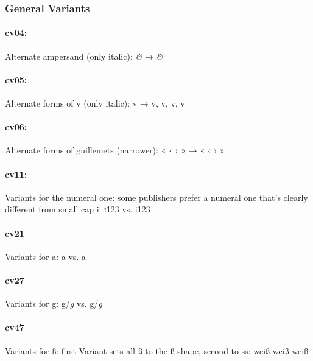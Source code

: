 \documentclass[pagesize,DIV14]{scrartcl}
\begin{document}
\subsubsection{General Variants}

\paragraph*{cv04:} Alternate ampersand (only italic): \textit{\&} → \textit{\&}

\paragraph*{cv05:} Alternate forms of v (only italic): 
{ v →
 v,
 v,
 v,
 v}

\paragraph*{cv06:} Alternate forms of guillemets (narrower): {« ‹ › »} → {« ‹ › »}

\paragraph*{cv11:} Variants for the numeral one: some publishers prefer a numeral one that’s clearly different from small cap i: \textsc{i123} vs. {i123}

\paragraph*{cv21} Variants for a: a vs. {a}

\paragraph*{cv27} Variants for g: g/\textit{g} vs. {g/\textit{g}}

\paragraph*{cv47} Variants for ß: first Variant sets all ß to the ß-shape, second to ss: {weiß {weiß} {weiß}}
\end{document}
